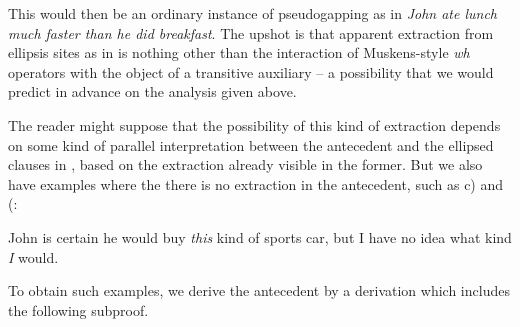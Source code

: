 \documentclass[output=paper,colorlinks,citecolor=brown]{langscibook}
\begin{document}
\begin{exe}
 \ex\label{other}
\end{exe}
This would then be an ordinary instance of pseudogapping as in \textit{John
ate lunch much faster than he did breakfast}. The upshot is that
apparent extraction from ellipsis sites as in  is nothing other than
the interaction of Muskens-style \textit{wh} operators with the object of a
transitive auxiliary -- a possibility that we would predict in advance
on the analysis given above.

The reader might suppose that the possibility of this kind of
extraction depends on some kind of parallel interpretation between the
antecedent and the ellipsed clauses in , based on the
extraction already visible in the former. But we also have examples
where the there is no extraction in the antecedent, such as c) and (:

\begin{exe}
 \ex\label{noparallel}
  John is certain he would buy \textsl{this} kind of sports car, but I have no
  idea what kind \textsl{I} would.
\end{exe}
To obtain such examples, we derive the antecedent by a derivation
which includes the following subproof.
\end{document}

